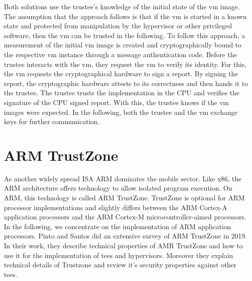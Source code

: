 Both solutions use the trustee's knowledge of the initial state of the \gls{vm}
image. The assumption that the approach follows is that if the \gls{vm} is
started in a known state and protected from manipulation by the hypervisor or
other privileged software, then the \gls{vm} can be trusted in the following. To
follow this approach, a measurement of the initial \gls{vm} image is created and
cryptographically bound to the respective \gls{vm} instance through a message
authentication code. Before the trustee interacts with the \gls{vm}, they
request the \gls{vm} to verify its identity. For this, the \gls{vm} requests the
cryptographical hardware to sign a report. By signing the report, the
cryptographic hardware attests to its correctness and then hands it to the
trustee. The trustee trusts the implementation in the CPU and verifies the
signature of the CPU signed report. With this, the trustee knows if the \gls{vm}
images were expected. In the following, both the trustee and the \gls{vm}
exchange keys for further communication.\\

\section{ARM TrustZone}
\label{sec:20:trustzone}
As another widely spread ISA ARM dominates the mobile sector. Like x86, the ARM
architecture offers technology to allow isolated program execution. On ARM, this
technology is called ARM TrustZone. TrustZone is optional for ARM processor
implementations and slightly differs between the ARM Cortex-A application
processors and the ARM Cortex-M microcontroller-aimed processors. In the
following, we concentrate on the implementation of ARM application
processors. Pinto and Santos did an extensive survey of ARM TrustZone in 2019.
In their work, they describe technical properties of AMR TrustZone and how to
use it for the implementation of \glspl{tee} and hypervisors. Moreover they
explain technical details of Trustzone and review it's security properties
against other \glspl{tee}.\cite{pinto_demystifying_2019}\\


